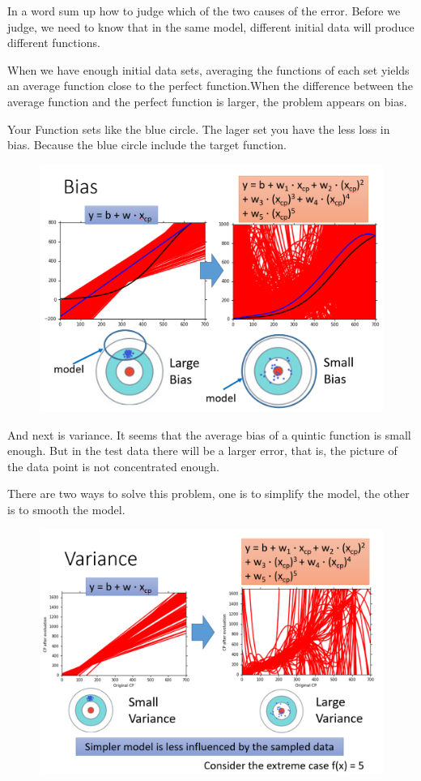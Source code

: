 \documentclass{article}
\begin{document}
In a word sum up how to judge which of the two causes of the error. Before we judge, we need to know that in the same model, different initial data will produce different functions.

When we have enough initial data sets, averaging the functions of each set yields an average function close to the perfect function.When the difference between the average function and the perfect function is larger, the problem appears on bias.

Your Function sets like the blue circle. The lager set you have the less loss in bias. Because the blue circle include the target function.

\newpage

\begin{figure}[htbp]
  \centering
  \includegraphics[scale=0.5]{pic/Bias.png}
  \label{fig:my_label}
\end{figure}

And next is variance. It seems that the average bias of a quintic function is small enough. But in the test data there will be a larger error, that is, the picture of the data point is not concentrated enough.

There are two ways to solve this problem, one is to simplify the model, the other is to smooth the model.

\begin{figure}[htbp]
  \centering
  \includegraphics[scale=0.5]{pic/Variance.png}
  \label{fig:my_label}
\end{figure}
\end{document}

